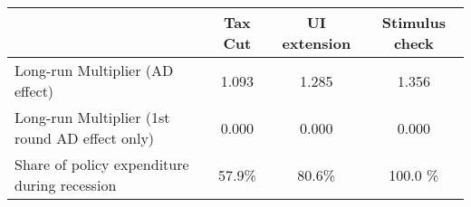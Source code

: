 \begin{tabular}{@{}lccc@{}}
\toprule
& Tax Cut    & UI extension    & Stimulus check    \\  \midrule
Long-run Multiplier (AD effect) &1.093  & 1.285  & 1.356     \\
Long-run Multiplier (1st round AD effect only) &0.000  & 0.000  & 0.000     \\
Share of policy expenditure during recession &57.9\%  & 80.6\%  & 100.0 \%    \\
\end{tabular}
